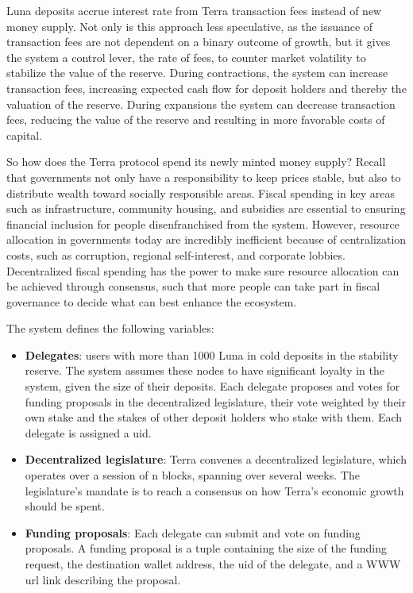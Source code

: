 \documentclass{article}
\begin{document}
Luna deposits accrue interest rate from Terra transaction fees instead of new money supply. Not only is this approach less speculative, as the issuance of transaction fees are not dependent on a binary outcome of growth, but it gives the system a control lever, the rate of fees, to counter market volatility to stabilize the value of the reserve. During contractions, the system can increase transaction fees, increasing expected cash flow for deposit holders and thereby the valuation of the reserve. During expansions the system can decrease transaction fees, reducing the value of the reserve and resulting in more favorable costs of capital.  

So how does the Terra protocol spend its newly minted money supply? Recall that governments not only have a responsibility to keep prices stable, but also to distribute wealth toward socially responsible areas. Fiscal spending in key areas such as infrastructure, community housing, and subsidies are essential to ensuring financial inclusion for people disenfranchised from the system. However, resource allocation in governments today are incredibly inefficient because of centralization costs, such as corruption, regional self-interest, and corporate lobbies. Decentralized fiscal spending has the power to make sure resource allocation can be achieved through consensus, such that more people can take part in fiscal governance to decide what can best enhance the ecosystem.

The system defines the following variables:
\begin{itemize}
    \item \textbf{Delegates}: users with more than 1000 Luna in cold deposits in the stability reserve. The system assumes these nodes to have significant loyalty in the system, given the size of their deposits. Each delegate proposes and votes for funding proposals in the decentralized legislature, their vote weighted by their own stake and the stakes of other deposit holders who stake with them. Each delegate is assigned a uid.
    
    \item \textbf{Decentralized legislature}: Terra convenes a decentralized legislature, which operates over a session of n blocks, spanning over several weeks. The legislature's mandate is to reach a consensus on how Terra's economic growth should be spent.
    
    \item \textbf{Funding proposals}: Each delegate can submit and vote on funding proposals. A funding proposal is a tuple containing the size of the funding request, the destination wallet address, the uid of the delegate, and a WWW url link describing the proposal.
\end{itemize}
\end{document}

